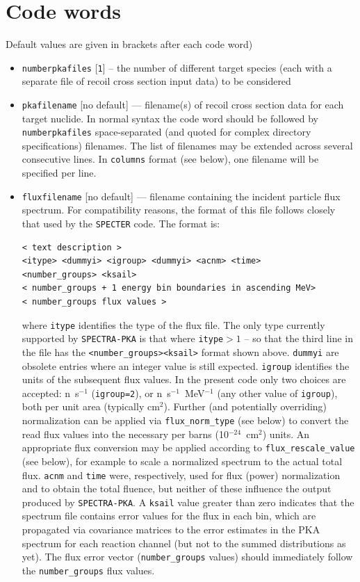 \documentclass[a4paper]{article}
\begin{document}
\section{Code words}
Default values are given in brackets after each code word)
\begin{itemize}


\item \texttt{number{\textunderscore}pka{\textunderscore}files} [\texttt{1}] -- the number of different target species (each with a separate file of recoil cross section input data) to be considered
\item \texttt{pka{\textunderscore}filename} [no default] --- filename(s) of recoil cross section data for each target nuclide. In normal syntax the code word should be followed by \texttt{number{\textunderscore}pka{\textunderscore}files} space-separated (and quoted for complex directory specifications) filenames. The list of filenames may be extended across several consecutive lines. In \texttt{columns} format (see below), one filename will be specified per line.
\item \texttt{flux{\textunderscore}filename} [no default] --- filename containing the incident particle flux spectrum. For compatibility reasons, the format of this file follows closely that used by the \texttt{SPECTER} code. The format is:\\
    \begin{verbatim}
< text description >
<itype> <dummyi> <igroup> <dummyi> <acnm> <time>
<number_groups> <ksail>
< number_groups + 1 energy bin boundaries in ascending MeV>
< number_groups flux values >
    \end{verbatim}
    where \texttt{itype} identifies the type of the flux file. The only type currently supported by \texttt{SPECTRA-PKA} is that where \texttt{itype}\(>1\) -- so that the third line in the file has the \verb|<number_groups><ksail>| format shown above. \texttt{dummyi} are obsolete entries where an integer value is still expected. \texttt{igroup} identifies the units of the subsequent flux values. In the present code only two choices are accepted: n~s\(^{-1}\) (\texttt{igroup=2}), or n~s\(^{-1}\)~MeV\(^{-1}\) (any other value of \texttt{igroup}), both per unit area (typically cm\(^2\)). Further (and potentially overriding) normalization can be applied via  \verb|flux_norm_type| (see below) to convert the read flux values into the necessary per barns (10\(^{-24}\)~cm\(^2\)) units. An appropriate flux conversion may be applied according to \verb|flux_rescale_value| (see below), for example to scale a normalized spectrum to the actual total flux.  \texttt{acnm} and \texttt{time} were, respectively, used for flux (power) normalization and to obtain the total fluence, but neither of these influence the output produced by \texttt{SPECTRA-PKA}. A \texttt{ksail} value greater than zero indicates that the spectrum file contains error values for the flux in each bin, which are propagated via covariance matrices to the error estimates in the PKA spectrum for each reaction channel (but not to the summed distributions as yet). The flux error vector (\verb|number_groups| values) should immediately follow the \verb|number_groups| flux values.

\end{itemize}
\end{document}
